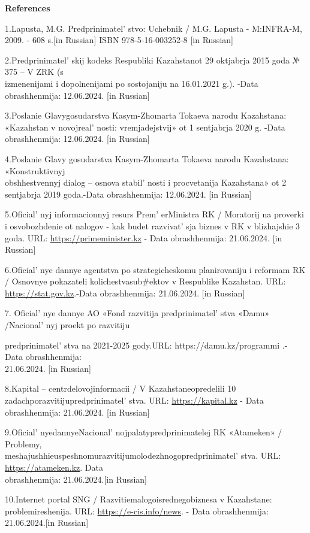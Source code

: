 \begin{center}
{\bfseries References}
\end{center}

\begin{references}
1.Lapusta, M.G. Predprinimatel' stvo: Uchebnik / M.G.
Lapusta - M:INFRA-M, 2009. - 608 s.{[}in Russian{]} ISBN
978-5-16-003252-8 {[}in Russian{]}

2.Predprinimatel' skij kodeks Respubliki Kazahstanot 29
oktjabrja 2015 goda № 375 -- V ZRK (s \\izmenenijami i dopolnenijami po
sostojaniju na 16.01.2021 g.). -Data obrashhenmija: 12.06.2024. {[}in
Russian{]}

3.Poslanie Glavygosudarstva Kasym-Zhomarta Tokaeva narodu Kazahstana:
«Kazahstan v novojreal' nosti: vremjadejstvij» ot 1
sentjabrja 2020 g. -Data obrashhenmija: 12.06.2024. {[}in Russian{]}

4.Poslanie Glavy gosudarstva Kasym-Zhomarta Tokaeva narodu Kazahstana:
«Konstruktivnyj \\obshhestvennyj dialog -- osnova
stabil' nosti i procvetanija Kazahstana» ot 2 sentjabrja
2019 goda.-Data obrashhenmija: 12.06.2024. {[}in Russian{]}

5.Oficial' nyj informacionnyj resurs
Prem' erMinistra RK / Moratorij na proverki i
osvobozhdenie ot nalogov - kak budet razvivat' sja biznes
v RK v blizhajshie 3 goda. URL: \href{https://primeminister.kz/}{https://primeminister.kz} - Data
obrashhenmija: 21.06.2024. {[}in Russian{]}

6.Oficial' nye dannye agentstva po strategicheskomu
planirovaniju i reformam RK / Osnovnye pokazateli kolichestvasub\#ektov
v Respublike Kazahstan. URL: \href{https://stat.gov.kz/}{https://stat.gov.kz}.-Data
obrashhenmija: 21.06.2024. {[}in Russian{]}

7. Oficial' nye dannye AO «Fond razvitija
predprinimatel' stva «Damu» /Nacional' nyj
proekt po razvitiju

predprinimatel' stva na 2021-2025
gody.URL: https://damu.kz/programmi .- Data obrashhenmija: \\21.06.2024.
{[}in Russian{]}

8.Kapital -- centrdelovojinformacii / V Kazahstaneopredelili 10
zadachporazvitijupredprinimatel' stva. URL:
\href{https://kapital.kz}{https://kapital.kz} - Data obrashhenmija: 21.06.2024. {[}in
Russian{]}

9.Oficial' nyedannyeNacional' nojpalatypredprinimatelej
RK «Atameken» / Problemy,\\
meshajushhieuspeshnomurazvitijumolodezhnogopredprinimatel' stva.
URL: \href{https://atameken.kz}{https://atameken.kz}. Data \\obrashhenmija: 21.06.2024.{[}in
Russian{]}

10.Internet portal SNG / Razvitiemalogoisrednegobiznesa v Kazahstane:
problemireshenija. URL: \href{https://e-cis.info/news}{https://e-cis.info/news}. - Data
obrashhenmija: 21.06.2024.{[}in Russian{]}
\end{references}

